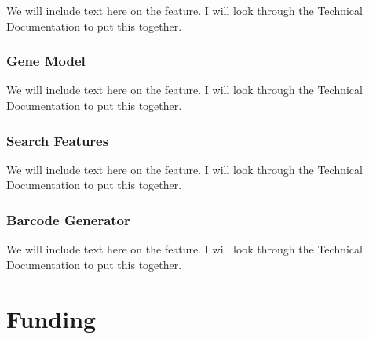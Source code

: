 \documentclass[unnumsec,webpdf,contemporary,large]{oup-authoring-template}%
\theoremstyle{thmstyleone}%
\theoremstyle{thmstyletwo}%
\theoremstyle{thmstylethree}%
\begin{document}
We will include text here on the feature. I will look through the Technical Documentation to put this together. 

\subsubsection{Gene Model}

We will include text here on the feature. I will look through the Technical Documentation to put this together. 

\subsubsection{Search Features}

We will include text here on the feature. I will look through the Technical Documentation to put this together. 

\subsubsection{Barcode Generator}

We will include text here on the feature. I will look through the Technical Documentation to put this together. 




\section{Funding}
\end{document}
